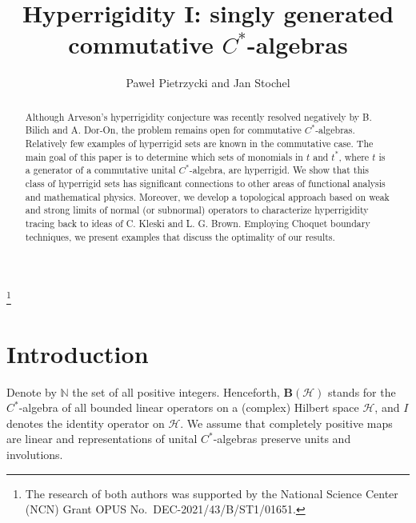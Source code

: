 \documentclass[reqno]{amsproc}
\numberwithin{equation}{section}
\theoremstyle{remark}
\newcommand*{\hh}{\mathcal{H}}
\newcommand*{\natu}{\mathbb{N}}
\theoremstyle{definition}
\newcommand*{\ogr}{\boldsymbol{B}}
\begin{document}
\title[Hyperrigidity I:
singly generated commutative $C^*$-algebras]
{Hyperrigidity I: singly generated commutative
$C^*$-algebras}

   \author[P. Pietrzycki and J. Stochel]{Pawe{\l} Pietrzycki and  Jan Stochel}



   \address{Wydzia{\l} Matematyki i Informatyki, Uniwersytet
Jagiello\'{n}ski, ul. {\L}ojasiewicza 6, PL-30348
Krak\'{o}w, Poland}


   \address{Wydzia{\l} Matematyki i Informatyki, Uniwersytet
Jagiello\'{n}ski, ul. {\L}ojasiewicza 6, PL-30348
Krak\'{o}w, Poland}


   \thanks{The research of both
authors was supported by the National Science Center
(NCN) Grant OPUS No.\ DEC-2021/43/B/ST1/01651.}

   \begin{abstract}
Although Arveson's hyperrigidity conjecture was
recently resolved negatively by B. Bilich and A.
Dor-On, the problem remains open for commutative
$C^*$-algebras. Relatively few examples of hyperrigid
sets are known in the commutative case. The main goal
of this paper is to determine which sets of monomials
in $t$ and $t^*$, where $t$ is a generator of a
commutative unital $C^*$-algebra, are hyperrigid. We
show that this class of hyperrigid sets has
significant connections to other areas of functional
analysis and mathematical physics. Moreover, we
develop a topological approach based on weak and
strong limits of normal (or subnormal) operators to
characterize hyperrigidity tracing back to ideas of C.
Kleski and L. G. Brown. Employing Choquet boundary
techniques, we present examples that discuss the
optimality of our results.
   \end{abstract}

   \maketitle

   \section{Introduction}
Denote by $\natu$ the set of all positive integers.
Henceforth, $\ogr(\hh)$ stands for the $C^*$-algebra
of all bounded linear operators on a (complex) Hilbert
space $\hh$, and $I$ denotes the identity operator on
$\hh$. We assume that completely positive maps are
linear and representations of unital $C^*$-algebras
preserve units and involutions.
\end{document}
